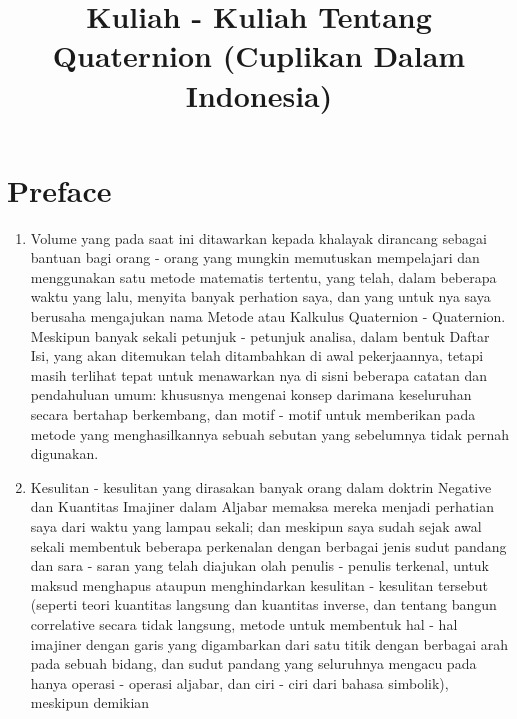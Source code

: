 \documentclass[a4paper, 12pt]{book}
\begin{document}
\title{\textbf{Kuliah - Kuliah Tentang Quaternion
(Cuplikan Dalam Indonesia)}}
\maketitle 

\chapter*{Preface}
\begin{enumerate}
\item Volume yang pada saat ini ditawarkan kepada khalayak dirancang sebagai 
bantuan bagi orang - orang yang mungkin memutuskan mempelajari dan menggunakan
satu metode matematis tertentu, yang telah, dalam beberapa waktu yang lalu, 
menyita banyak perhation saya, dan yang untuk nya saya berusaha mengajukan nama
Metode atau Kalkulus Quaternion - Quaternion. Meskipun banyak sekali petunjuk -
petunjuk analisa, dalam bentuk Daftar Isi, yang akan ditemukan telah 
ditambahkan di awal pekerjaannya, tetapi masih terlihat tepat untuk menawarkan
nya di sisni beberapa catatan dan pendahuluan umum: khususnya mengenai konsep 
darimana keseluruhan secara bertahap berkembang, dan motif - motif untuk 
memberikan pada metode yang menghasilkannya sebuah sebutan yang sebelumnya
tidak pernah digunakan.
\item Kesulitan - kesulitan yang dirasakan banyak orang dalam doktrin Negative
dan Kuantitas Imajiner dalam Aljabar memaksa mereka menjadi perhatian saya dari
waktu yang lampau sekali; dan meskipun saya sudah sejak awal sekali membentuk
beberapa perkenalan dengan berbagai jenis sudut pandang dan sara - saran yang
telah diajukan olah penulis - penulis terkenal, untuk maksud menghapus ataupun
menghindarkan kesulitan - kesulitan tersebut (seperti teori kuantitas langsung
dan kuantitas inverse, dan tentang bangun correlative secara tidak langsung, 
metode untuk membentuk hal - hal imajiner dengan garis yang digambarkan dari 
satu titik dengan berbagai arah pada sebuah bidang, dan sudut pandang yang 
seluruhnya mengacu pada hanya operasi - operasi aljabar, dan ciri - ciri dari
bahasa simbolik), meskipun demikian 

\end{enumerate}
\end{document}
